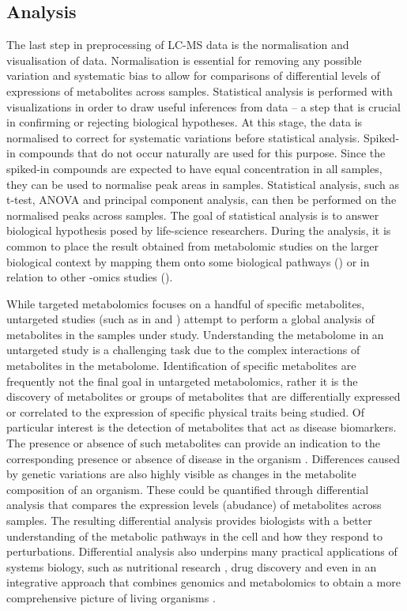 \subsection{Analysis}

The last step in preprocessing of LC-MS data is the normalisation and visualisation of data. Normalisation is essential for removing any possible variation and systematic bias to allow for comparisons of differential levels of expressions of metabolites across samples. Statistical analysis is performed with visualizations in order to draw useful inferences from data -- a step that is crucial in confirming or rejecting biological hypotheses. At this stage, the data is normalised to correct for systematic variations before statistical analysis. Spiked-in compounds that do not occur naturally are used for this purpose. Since the spiked-in compounds are expected to have equal concentration in all samples, they can be used to normalise peak areas in samples. Statistical analysis, such as t-test, ANOVA and principal component analysis, can then be performed on the normalised peaks across samples. The goal of statistical analysis is to answer biological hypothesis posed by life-science researchers. During the analysis, it is common to place the result obtained from metabolomic studies on the larger biological context by mapping them onto some biological pathways (\cite{Xia2010,Krumsiek2011a}) or in relation to other -omics studies (\cite{Krumsiek2012,Gieger2008}).

While targeted metabolomics focuses on a handful of specific metabolites, untargeted studies (such as in \cite{DeVos2007a} and \cite{Creek2011}) attempt to perform a global analysis of metabolites in the samples under study. Understanding the metabolome in an untargeted study is a challenging task due to the complex interactions of metabolites in the metabolome. Identification of specific metabolites are frequently not the final goal in untargeted metabolomics, rather it is the discovery of metabolites or groups of metabolites that are differentially expressed or correlated to the expression of specific physical traits being studied. Of particular interest is the detection of metabolites that act as disease biomarkers. The presence or absence of such metabolites can provide an indication to the corresponding presence or absence of disease in the organism \cite{mamas2011role}. Differences caused by genetic variations are also highly visible as changes in the metabolite composition of an organism. These could be quantified through differential analysis that compares the expression levels (abudance) of metabolites across samples. The resulting differential analysis provides biologists with a better understanding of the metabolic pathways in the cell and how they respond to perturbations. Differential analysis also underpins many practical applications of systems biology, such as nutritional research \cite{Gibney2005}, drug discovery \cite{Kell2006} and even in an integrative approach that combines genomics and metabolomics to obtain a more comprehensive picture of living organisms \cite{Gieger2008}. 

